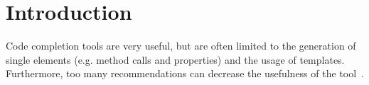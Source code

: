\label{chapter:background}

\newlength{\savedunitlength}
\setlength{\unitlength}{2em}

\section{Introduction}
Code completion tools are very useful, but are often limited to the generation of single elements (e.g. method calls and properties) and the usage of templates. Furthermore, too many recommendations can decrease the usefulness of the tool~\cite{Proksch2015}. 





\setlength{\unitlength}{\savedunitlength}
